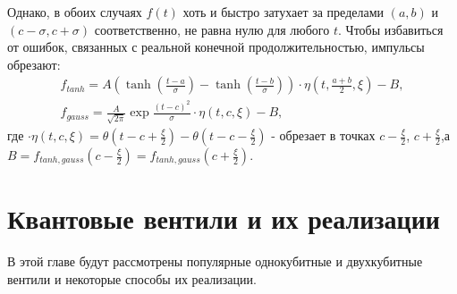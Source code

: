 \documentclass[12pt, twoside]{report}
\numberwithin{equation}{section}
\numberwithin{figure}{section}
\begin{document}
Однако, в обоих случаях $f(t)$ хоть и быстро затухает за пределами $(a,b)$ и $(c-\sigma,c+\sigma)$ соответственно, не равна нулю для любого $t$. Чтобы избавиться от ошибок, связанных с реальной конечной продолжительностью, импульсы обрезают:
\begin{gather*}
f_{tanh} = A \left( \tanh \left( \frac{t-a}{\sigma} \right) - \tanh \left( \frac{t-b}{\sigma} \right) \right) \cdot \eta \left(t, \frac{a+b}{2}, \xi \right) - B, \\
f_{gauss} = \frac{A}{\sqrt{2 \pi}}  \exp\frac{ \left( t - c\right)^2}{\sigma} \cdot \eta \left(t, c, \xi \right) - B,
\end{gather*}
где $\cdot \eta \left(t, c, \xi \right) = \theta(t-c+\frac{\xi}{2}) - \theta(t-c-\frac{\xi}{2})$ - обрезает в точках $c-\frac{\xi}{2}$, $c+\frac{\xi}{2}$,\newline а $B =f_{tanh,gauss}(c-\frac{\xi}{2}) = f_{tanh,gauss}(c+\frac{\xi}{2})$.


\section{Квантовые вентили и их реализации}
В этой главе будут рассмотрены популярные однокубитные и двухкубитные вентили и некоторые способы их реализации.
\end{document}

